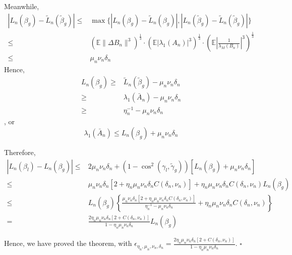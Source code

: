 \documentclass{article} \usepackage{iclr2019_conference,times}
\newcommand{\expe}{\mathbb{E}}
\begin{document}
Meanwhile,
\begin{equation}
    \begin{split}
        |L_n(\beta_g) - \tilde{L}_n(\tilde{\beta}_g)| \leq & \max\{ |L_n(\beta_g) - \tilde{L}_n(\beta_g)|, |L_n(\tilde{\beta}_g) - \tilde{L}_n(\tilde{\beta}_g)| \} \\
        \leq & (\expe \| \Delta B_n \|^3)^{\frac{1}{3}} \cdot (\expe |\lambda_1(A_n)|^3)^{\frac{1}{3}} \cdot (\expe |\frac{1}{\lambda_M(B_n)}|^3)^{\frac{1}{3}} \\
        \leq & \mu_n \nu_n \delta_n
    \end{split}
\end{equation}
Hence, 
\begin{equation}
    \begin{split}
        L_n(\beta_g) \geq & \tilde{L}_n(\tilde{\beta}_g) - \mu_n \nu_n \delta_n \\
        \geq & \lambda_1(\bar{A}_n) - \mu_n \nu_n \delta_n \\
        \geq & \eta_n^{-1} - \mu_n \nu_n \delta_n 
    \end{split}
\end{equation}, or 
\begin{equation}
    \lambda_1(\bar{A}_n) \leq L_n(\beta_g) + \mu_n \nu_n \delta_n
\end{equation}

Therefore, 
\begin{equation}
    \begin{split}
        |L_n(\beta_l) - L_n(\beta_g)| \leq & 2 \mu_n \nu_n \delta_n + (1 - \cos^2(\gamma_l, \tilde{\gamma}_g)) [L_n(\beta_g) + \mu_n \nu_n \delta_n] \\
        \leq & \mu_n \nu_n \delta_n [2 + \eta_n \mu_n \nu_n \delta_n C(\delta_n, \nu_n)] + \eta_n \mu_n \nu_n \delta_n C(\delta_n, \nu_n) L_n(\beta_g) \\
        \leq & L_n(\beta_g) \left\{ \frac{\mu_n \nu_n \delta_n [2 + \eta_n \mu_n \nu_n \delta_n C(\delta_n, \nu_n)]}{\eta_n^{-1} - \mu_n \nu_n \delta_n} + \eta_n \mu_n \nu_n \delta_n C(\delta_n, \nu_n) \right\} \\
        =& \frac{2 \eta_n \mu_n \nu_n \delta_n [2 + C(\delta_n, \nu_n)]}{1 - \eta_n \mu_n \nu_n \delta_n} L_n(\beta_g)
    \end{split}
\end{equation}

Hence, we have proved the theorem, with $\epsilon_{\eta_n, \mu_n, \nu_n, \delta_n} = \frac{2 \eta_n \mu_n \nu_n \delta_n [2 + C(\delta_n, \nu_n)]}{1 - \eta_n \mu_n \nu_n \delta_n}$. $\square$
\end{document}

